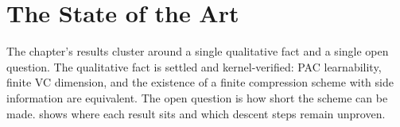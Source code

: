 
\section{The State of the Art}
\label{sec:compression-summary}

The chapter's results cluster around a single qualitative fact and a single open
question.  The qualitative fact is settled and kernel-verified: PAC learnability,
finite VC dimension, and the existence of a finite compression scheme with side
information are equivalent.  The open question is how short the scheme can be
made.   shows where each result sits and which
descent steps remain unproven.

